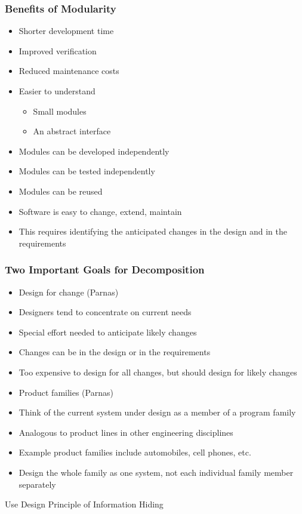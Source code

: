 \documentclass[t,12pt,numbers,fleqn]{beamer}
\begin{document}
\begin{frame}
\frametitle{Benefits of Modularity}
\begin{itemize}
\item Shorter development time
\item Improved verification
\item Reduced maintenance costs
\item Easier to understand
\begin{itemize}
\item Small modules
\item An abstract interface
\end{itemize}
\item Modules can be developed independently
\item Modules can be tested independently
\item Modules can be reused
\item Software is easy to change, extend, maintain
\item This requires identifying the anticipated changes in the design and in the requirements
\end{itemize}
\end{frame}


\begin{frame}
\frametitle{Two Important Goals for Decomposition}

\begin{itemize}

\item Design for change (Parnas) \cite{Parnas1972a, Parnas1974}
\bi
\item Designers tend to concentrate on current needs
\item Special effort needed to anticipate likely changes
\item Changes can be in the design or in the requirements
\item Too expensive to design for all changes, but should design for likely
  changes
\ei
\item Product families (Parnas) \cite{Parnas1976, Parnas1979}
\bi
\item Think of the current system under design as a member of a program family
\item Analogous to product lines in other engineering disciplines
\item Example product families include automobiles, cell phones, etc.
\item Design the whole family as one system, not each individual family member
  separately 
\ei
\end{itemize}

Use Design Principle of Information Hiding

\end{frame}
\end{document}
